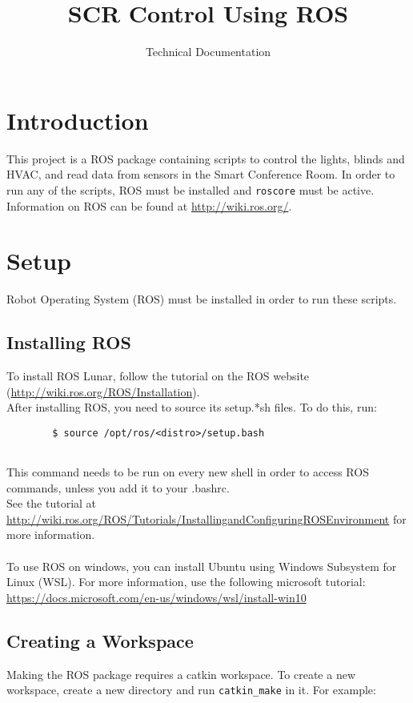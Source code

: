 \documentclass[twoside]{article}
\title{SCR Control Using ROS}
\author{Technical Documentation}
\date{ }
\begin{document}
	\maketitle
	
	\tableofcontents
	\newpage
	
	\section{Introduction}
	This project is a ROS package containing scripts to control the lights, blinds and HVAC, and read data from sensors in the Smart Conference Room. In order to run any of the scripts, ROS must be installed and \verb|roscore| must be active. Information on ROS can be found at \url{http://wiki.ros.org/}.
	

	
	\section{Setup}
	
	
	Robot Operating System (ROS) must be installed in order to run these scripts.
	
	\subsection{Installing ROS}
	To install ROS Lunar, follow the tutorial on the ROS website (\url{http://wiki.ros.org/ROS/Installation}).\\
	After installing ROS, you need to source its setup.*sh files. To do this, run:
	
	\begin{verbatim}
	    $ source /opt/ros/<distro>/setup.bash
	    
	\end{verbatim}
	This command needs to be run on every new shell in order to access ROS commands, unless you add it to your .bashrc.\\
	See the tutorial at \url{http://wiki.ros.org/ROS/Tutorials/InstallingandConfiguringROSEnvironment} for more information. \\  \\
	To use ROS on windows, you can install Ubuntu using Windows Subsystem for Linux (WSL). For more information, use the following microsoft tutorial: \url{https://docs.microsoft.com/en-us/windows/wsl/install-win10}
	
	\subsection{Creating a Workspace}
	Making the ROS package requires a catkin workspace. To create a new workspace, create a new directory and run \verb|catkin_make| in it. For example:
	
\end{document}
